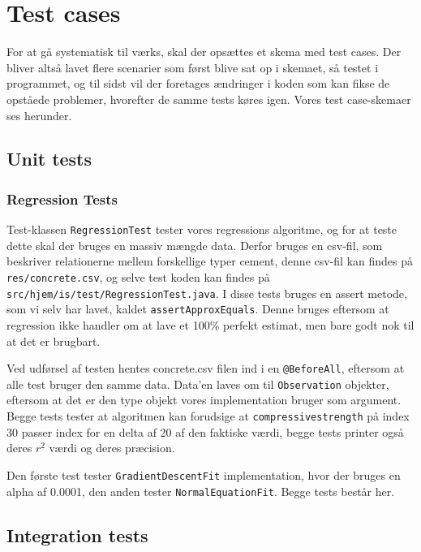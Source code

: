 \section{Test cases}
For at gå systematisk til værks, skal der opsættes et skema med test cases\cite{Heumann}. Der bliver altså lavet flere scenarier som først blive sat op i skemaet, så testet i programmet, og til sidst vil der foretages ændringer i koden som kan fikse de opståede problemer, hvorefter de samme tests køres igen. Vores test case-skemaer ses herunder.

\subsection{Unit tests}
\subsubsection{Regression Tests}
Test-klassen \texttt{RegressionTest} tester vores regressions algoritme, og for at teste dette skal der bruges en massiv mængde data. Derfor bruges en csv-fil, som beskriver relationerne mellem forskellige typer cement, denne csv-fil kan findes på \texttt{res/concrete.csv}, og selve test koden kan findes på \texttt{src/hjem/is/test/RegressionTest.java}. I disse tests bruges en assert metode, som vi selv har lavet, kaldet \texttt{assertApproxEquals}. Denne bruges eftersom at regression ikke handler om at lave et 100\% perfekt estimat, men bare godt nok til at det er brugbart.

Ved udførsel af testen hentes concrete.csv filen ind i en \texttt{@BeforeAll}, eftersom at alle test bruger den samme data. Data'en laves om til \texttt{Observation} objekter, eftersom at det er den type objekt vores implementation bruger som argument. Begge tests tester at algoritmen kan forudsige at \texttt{compressivestrength} på index 30 passer index for en delta af 20 af den faktiske værdi, begge tests printer også deres $r^{2}$ værdi og deres præcision.

Den første test tester \texttt{GradientDescentFit}\cite{GradientDescent} implementation, hvor der bruges en alpha af 0.0001, den anden tester \texttt{NormalEquationFit}\cite{NormalEquation}. Begge tests består her. 

\subsection{Integration tests}

